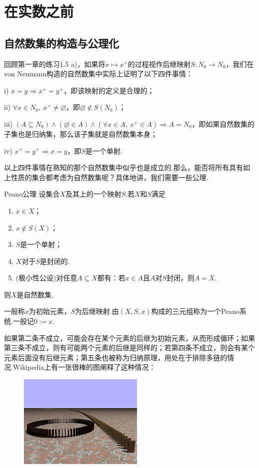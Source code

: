 \documentclass[lang=cn, zihao=5]{elegantbook}
\begin{document}
\chapter{在实数之前}

\section{自然数集的构造与公理化}

回顾第一章的练习1.5 a)，如果将$x \mapsto x^+$的过程视作后继映射$S:N_0 \to N_0$，我们在von Neumann构造的自然数集中实际上证明了以下四件事情：

i) $x=y \Rightarrow x^+ = y^+$，即该映射的定义是合理的；

ii) $\forall x \in N_0,~x^+ \neq \varnothing$，即$\varnothing \notin S(N_0)$；

iii) $(A \subseteq N_0) \wedge (\varnothing \in A) \wedge (\forall x \in A,~x^+ \in A) \Rightarrow A=N_0$，即如果自然数集的子集也是归纳集，那么该子集就是自然数集本身；

iv) $x^+=y^+ \Rightarrow x=y$，即$S$是一个单射.

以上四件事情在熟知的那个自然数集中似乎也是成立的.那么，能否将所有具有如上性质的集合都考虑为自然数集呢？具体地讲，我们需要一些公理.

\begin{axiom}{Peano公理}
	设集合$X$及其上的一个映射$S$.若$X$和$S$满足
	\begin{enumerate}
		\item $x \in X$；
		\item $x \notin S(X)$；
		\item $S$是一个单射；
		\item $X$对于$S$是封闭的.
		\item (极小性公设)对任意$A \subseteq X$都有：若$x \in A$且$A$对$S$封闭，则$A=X$.
	\end{enumerate}
	则$X$是自然数集.
\end{axiom}
\begin{remark}
	一般称$x$为初始元素，$S$为后继映射.由$(X,S,x)$构成的三元组称为一个Peano系统.一般记$0:=x$.
\end{remark}

如果第二条不成立，可能会存在某个元素的后继为初始元素，从而形成循环；如果第三条不成立，则有可能两个元素的后继是同样的；若第四条不成立，则会有某个元素后面没有后继元素；第五条也被称为归纳原理，用处在于排除多链的情况.Wikipedia上有一张很棒的图阐释了这种情况：

\begin{figure}[h!]
	\centering
	\includegraphics[width=6cm]{attachment/440px-Domino_effect_visualizing_exclusion_of_junk_term_by_induction_axiom.jpg}
\end{figure}
\end{document}
